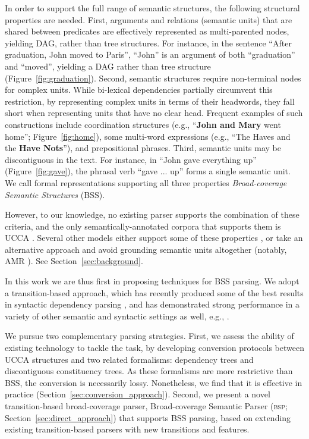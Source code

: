 \documentclass[11pt]{article}
\newcommand{\secref}[1]{Section~\ref{#1}}
\newcommand{\figref}[1]{Figure~\ref{#1}}
\begin{document}
In order to support the full range of semantic structures, the following
structural properties are needed. First, arguments and relations (semantic units)
that are shared between predicates are effectively represented as multi-parented nodes,
yielding DAG, rather than tree structures. For instance, in the sentence
``After graduation, John moved to Paris'', ``John'' is an argument of both ``graduation''
and ``moved'', yielding a DAG rather than tree structure (\figref{fig:graduation}).
Second, semantic structures require non-terminal nodes for complex units.
While bi-lexical dependencies partially circumvent this restriction, by
representing complex units in terms of their headwords, they fall short
when representing units that have no clear head.
Frequent examples of such constructions include
coordination structures (e.g., ``{\bf John and Mary} went home''; \figref{fig:home}),
some multi-word expressions (e.g., ``The Haves and the {\bf Have Nots}''),
and prepositional phrases.
Third, semantic units may be discontiguous in the text. For instance, in ``John gave everything up''
(\figref{fig:gave}), the phrasal verb ``gave ... up'' forms a single semantic unit.
We call formal representations supporting all three properties
{\it Broad-coverage Semantic Structures} (BSS).

However, to our knowledge, no existing parser supports the combination of these criteria,
and the only semantically-annotated corpora that supports them is UCCA \cite{abend2013universal}.
Several other models either support some of these properties \cite{oepen2015semeval},
or take an alternative approach and avoid grounding semantic units
altogether (notably, AMR \cite{banarescu2013abstract}). See \secref{sec:background}.

In this work we are thus first in proposing techniques for BSS parsing.
We adopt a transition-based approach, which has recently produced some of the best
results in syntactic dependency parsing
\cite{dyer2015transition,ballesteros2015improved}, and has demonstrated
strong performance in a variety of other semantic and syntactic settings as well,
e.g., .

We pursue two complementary parsing strategies.
First, we assess the ability of existing technology to tackle the task,
by developing conversion protocols between UCCA structures and two related formalisms:
dependency trees and discontiguous constituency trees.
As these formalisms are more restrictive than BSS, the conversion
is necessarily lossy. Nonetheless, we find that it is effective
in practice (\secref{sec:conversion_approach}).
Second, we present a novel transition-based broad-coverage parser,
Broad-coverage Semantic Parser (\textsc{bsp}; \secref{sec:direct_approach})
that supports BSS parsing, based on extending existing transition-based parsers
with new transitions and features. %
\end{document}
